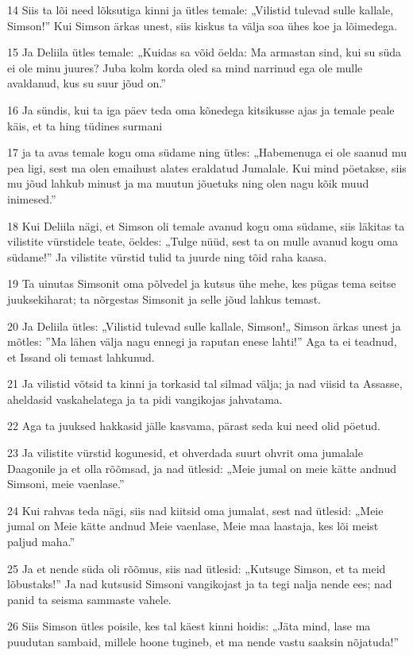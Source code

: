 \par 14 Siis ta lõi need lõksutiga kinni ja ütles temale: „Vilistid tulevad sulle kallale, Simson!” Kui Simson ärkas unest, siis kiskus ta välja soa ühes koe ja lõimedega.
\par 15 Ja Deliila ütles temale: „Kuidas sa võid öelda: Ma armastan sind, kui su süda ei ole minu juures? Juba kolm korda oled sa mind narrinud ega ole mulle avaldanud, kus su suur jõud on.”
\par 16 Ja sündis, kui ta iga päev teda oma kõnedega kitsikusse ajas ja temale peale käis, et ta hing tüdines surmani
\par 17 ja ta avas temale kogu oma südame ning ütles: „Habemenuga ei ole saanud mu pea ligi, sest ma olen emaihust alates eraldatud Jumalale. Kui mind pöetakse, siis mu jõud lahkub minust ja ma muutun jõuetuks ning olen nagu kõik muud inimesed.”
\par 18 Kui Deliila nägi, et Simson oli temale avanud kogu oma südame, siis läkitas ta vilistite vürstidele teate, öeldes: „Tulge nüüd, sest ta on mulle avanud kogu oma südame!” Ja vilistite vürstid tulid ta juurde ning tõid raha kaasa.
\par 19 Ta uinutas Simsonit oma põlvedel ja kutsus ühe mehe, kes pügas tema seitse juuksekiharat; ta nõrgestas Simsonit ja selle jõud lahkus temast.
\par 20 Ja Deliila ütles: „Vilistid tulevad sulle kallale, Simson!„ Simson ärkas unest ja mõtles: ”Ma lähen välja nagu ennegi ja raputan enese lahti!” Aga ta ei teadnud, et Issand oli temast lahkunud.
\par 21 Ja vilistid võtsid ta kinni ja torkasid tal silmad välja; ja nad viisid ta Assasse, aheldasid vaskahelatega ja ta pidi vangikojas jahvatama.
\par 22 Aga ta juuksed hakkasid jälle kasvama, pärast seda kui need olid pöetud.
\par 23 Ja vilistite vürstid kogunesid, et ohverdada suurt ohvrit oma jumalale Daagonile ja et olla rõõmsad, ja nad ütlesid: „Meie jumal on meie kätte andnud Simsoni, meie vaenlase.”
\par 24 Kui rahvas teda nägi, siis nad kiitsid oma jumalat, sest nad ütlesid: „Meie jumal on Meie kätte andnud Meie vaenlase, Meie maa laastaja, kes lõi meist paljud maha.”
\par 25 Ja et nende süda oli rõõmus, siis nad ütlesid: „Kutsuge Simson, et ta meid lõbustaks!” Ja nad kutsusid Simsoni vangikojast ja ta tegi nalja nende ees; nad panid ta seisma sammaste vahele.
\par 26 Siis Simson ütles poisile, kes tal käest kinni hoidis: „Jäta mind, lase ma puudutan sambaid, millele hoone tugineb, et ma nende vastu saaksin nõjatuda!”
